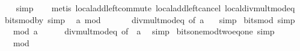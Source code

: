 \begin{isabellebody}
\ \ \isamarkupfalse%
\ simp\isanewline
\ \ \isamarkupfalse%
\ {\isacharparenleft}{\kern0pt}metis\ local{\isachardot}{\kern0pt}add{\isachardot}{\kern0pt}left{\isacharunderscore}{\kern0pt}commute\ local{\isachardot}{\kern0pt}add{\isacharunderscore}{\kern0pt}left{\isacharunderscore}{\kern0pt}cancel\ local{\isachardot}{\kern0pt}div{\isacharunderscore}{\kern0pt}mult{\isacharunderscore}{\kern0pt}mod{\isacharunderscore}{\kern0pt}eq{\isacharparenright}{\kern0pt}%
\endisatagproof
{\isafoldproof}%
%
\isadelimproof
\isanewline
%
\endisadelimproof
\isanewline
{}\isamarkupfalse%
\ bits{\isacharunderscore}{\kern0pt}mod{\isacharunderscore}{\kern0pt}by{\isacharunderscore}{\kern0pt}{}\ {\isacharbrackleft}{\kern0pt}simp{\isacharbrackright}{\kern0pt}{\isacharcolon}{\kern0pt}\isanewline
\ \ {\isacartoucheopen}a\ mod\ {}\ {\isacharequal}{\kern0pt}\ {}{\isacartoucheclose}\isanewline
%
\isadelimproof
\ \ %
\endisadelimproof
%
\isatagproof
{}\isamarkupfalse%
\ div{\isacharunderscore}{\kern0pt}mult{\isacharunderscore}{\kern0pt}mod{\isacharunderscore}{\kern0pt}eq\ {\isacharbrackleft}{\kern0pt}of\ a\ {}{\isacharbrackright}{\kern0pt}\ \isamarkupfalse%
\ simp%
\endisatagproof
{\isafoldproof}%
%
\isadelimproof
\isanewline
%
\endisadelimproof
\isanewline
{}\isamarkupfalse%
\ bits{\isacharunderscore}{\kern0pt}mod{\isacharunderscore}{\kern0pt}{}\ {\isacharbrackleft}{\kern0pt}simp{\isacharbrackright}{\kern0pt}{\isacharcolon}{\kern0pt}\isanewline
\ \ {\isacartoucheopen}{}\ mod\ a\ {\isacharequal}{\kern0pt}\ {}{\isacartoucheclose}\isanewline
%
\isadelimproof
\ \ %
\endisadelimproof
%
\isatagproof
{}\isamarkupfalse%
\ div{\isacharunderscore}{\kern0pt}mult{\isacharunderscore}{\kern0pt}mod{\isacharunderscore}{\kern0pt}eq\ {\isacharbrackleft}{\kern0pt}of\ {}\ a{\isacharbrackright}{\kern0pt}\ \isamarkupfalse%
\ simp%
\endisatagproof
{\isafoldproof}%
%
\isadelimproof
\isanewline
%
\endisadelimproof
\isanewline
{}\isamarkupfalse%
\ bits{\isacharunderscore}{\kern0pt}one{\isacharunderscore}{\kern0pt}mod{\isacharunderscore}{\kern0pt}two{\isacharunderscore}{\kern0pt}eq{\isacharunderscore}{\kern0pt}one\ {\isacharbrackleft}{\kern0pt}simp{\isacharbrackright}{\kern0pt}{\isacharcolon}{\kern0pt}\isanewline
\ \ {\isacartoucheopen}{}\ mod\ {}\ {\isacharequal}{\kern0pt}\ {}{\isacartoucheclose}\isanewline
%
\isadelimproof
\ \ %
\endisadelimproof

\end{isabellebody}
